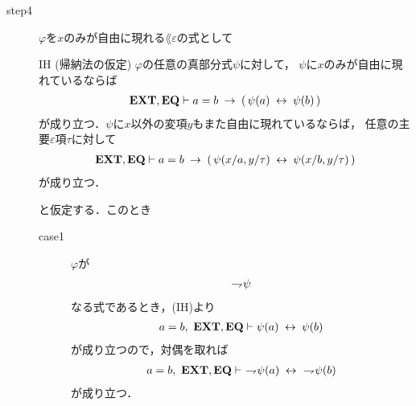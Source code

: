 \begin{sketch}
\begin{description}
			\item[step4]
				$\varphi$を$x$のみが自由に現れる$\lang{\varepsilon}$の式として
				\begin{itembox}[l]{IH (帰納法の仮定)}
					$\varphi$の任意の真部分式$\psi$に対して，
					$\psi$に$x$のみが自由に現れているならば
					\begin{align}
						\mbox{{\bf EXT}},\mbox{{\bf EQ}} \vdash a = b \hspace{0.25em}\rightarrow\hspace{0.25em} (\, \psi(a) \hspace{0.25em}\leftrightarrow\hspace{0.25em} \psi(b)\, )
					\end{align}
					が成り立つ．$\psi$に$x$以外の変項$y$もまた自由に現れているならば，
					任意の主要$\varepsilon$項$\tau$に対して
					\begin{align}
						\mbox{{\bf EXT}},\mbox{{\bf EQ}} \vdash a = b \hspace{0.25em}\rightarrow\hspace{0.25em} (\, \psi(x/a,y/\tau) \hspace{0.25em}\leftrightarrow\hspace{0.25em} \psi(x/b,y/\tau)\, )
					\end{align}
					が成り立つ．
				\end{itembox}
				と仮定する．このとき
				\begin{description}
					\item[case1] $\varphi$が
						\begin{align}
							\rightharpoondown\hspace{-0.25em} \psi
						\end{align}
						なる式であるとき，(IH)より
						\begin{align}
							a = b,\ \mbox{{\bf EXT}},\mbox{{\bf EQ}} \vdash \psi(a) \hspace{0.25em}\leftrightarrow\hspace{0.25em} \psi(b)
						\end{align}
						が成り立つので，対偶を取れば
						\begin{align}
							a = b,\ \EXTAX,\EQAX \vdash\ 
							\negation \psi(a) \lrarrow\ \negation \psi(b)
						\end{align}
						が成り立つ．
						

\end{description}
\end{description}
\end{sketch}
